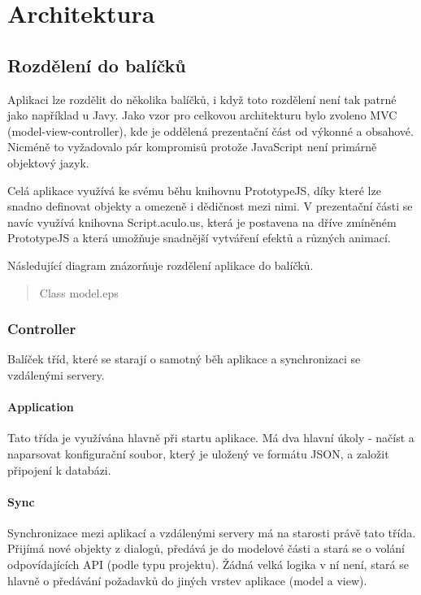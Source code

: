 \chapter{Architektura}

\section{Rozdělení do balíčků}

Aplikaci lze rozdělit do několika balíčků, i když toto rozdělení není tak patrné jako například u Javy. Jako vzor pro celkovou architekturu bylo zvoleno MVC (model-view-controller), kde je oddělená prezentační část od výkonné a obsahové. Nicméně to vyžadovalo pár kompromisů protože JavaScript není primárně objektový jazyk.

Celá aplikace využívá ke svému běhu knihovnu PrototypeJS\cite{prototypejs}, díky které lze snadno definovat objekty a omezeně i dědičnost mezi nimi. V prezentační části se navíc využívá knihovna Script.aculo.us\cite{scriptaculous}, která je postavena na dříve zmíněném PrototypeJS a která umožňuje snadnější vytváření efektů a různých animací.

Následující diagram znázorňuje rozdělení aplikace do balíčků.

\begin{quote}
Class model.eps
\end{quote}

\subsection{Controller}

Balíček tříd, které se starají o samotný běh aplikace a synchronizaci se vzdálenými servery.

\subsubsection{Application}

Tato třída je využívána hlavně při startu aplikace. Má dva hlavní úkoly - načíst a naparsovat konfigurační soubor, který je uložený ve formátu JSON, a založit připojení k databázi.

\subsubsection{Sync}

Synchronizace mezi aplikací a vzdálenými servery má na starosti právě tato třída. Přijímá nové objekty z dialogů, předává je do modelové části a stará se o volání odpovídajících API (podle typu projektu). Žádná velká logika v ní není, stará se hlavně o předávání požadavků do jiných vrstev aplikace (model a view).

